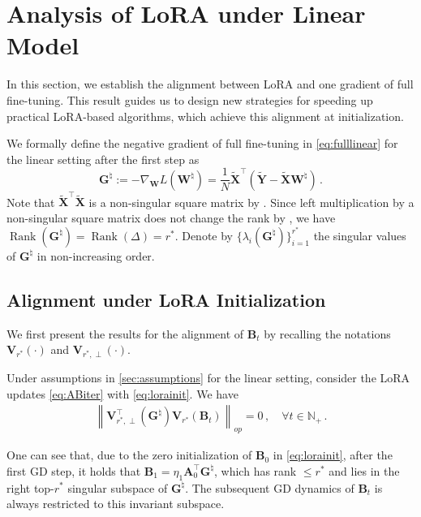 \section{Analysis of LoRA under Linear Model}
\label{sec:linear}

In this section, we establish the alignment between LoRA and one gradient of full fine-tuning. This result guides us to design new strategies for speeding up practical LoRA-based algorithms, which achieve this alignment at initialization.

We formally define the negative gradient of full fine-tuning in \cref{eq:fulllinear} for the linear setting after the first step as
\begin{equation}\label{eq:G}
  {\bm G}^{\natural} := -\nabla_{\bm W} {L}(\bm W^\natural) = \frac{1}{N}\widetilde{\bm X}^{\!\top} (\widetilde{\bm Y} - \widetilde{\bm X}\bm W^\natural) \,.
\end{equation} 
Note that $\widetilde{\bm X}^{\!\top}\widetilde{\bm X}$ is a non-singular square matrix by \citet[Lemma 6]{zeng2023expressive}. Since left multiplication by a non-singular square matrix does not change the rank by \citet[0.4.6 (b)]{horn2012matrix}, we have $\operatorname{Rank}({\bm G}^{\natural}) = \operatorname{Rank}(\Delta) = r^*$. Denote by $\{ \lambda_i({\bm G}^{\natural}) \}_{i=1}^{r^*}$ the singular values of $\bm G^{\natural}$ in non-increasing order.

\subsection{Alignment under LoRA Initialization}
\label{sec:align_linear}

We first present the results for the alignment of $\bm B_t$ by recalling the notations $\bm V_{r^*}(\cdot)$ and $\bm V_{r^*,\perp}(\cdot)$.
\begin{theorem}
\label{thm:alignlinearB}
    Under assumptions in \cref{sec:assumptions} for the linear setting, consider the LoRA updates \eqref{eq:ABiter} with \eqref{eq:lorainit}. We have
    \begin{align*}
        \left\|\bm V^{\!\top}_{r^*,\perp}\left({\bm G}^{\natural}\right)\bm V_{r^*}\left(\bm B_t\right)\right\|_{op} = 0\,, \quad \forall t \in \mathbb{N}_+\, .
    \end{align*}
\end{theorem}
One can see that, due to the zero initialization of $\bm B_0$ in \eqref{eq:lorainit}, after the first GD step, it holds that $\bm B_1 = \eta_1 \bm A_0^{\!\top} \bm G^\natural$,  which has rank $\leq r^*$ and lies in the right top-$r^*$ singular subspace of $\bm G^\natural$. The subsequent GD dynamics of $\bm B_t$ is always restricted to this invariant subspace.

